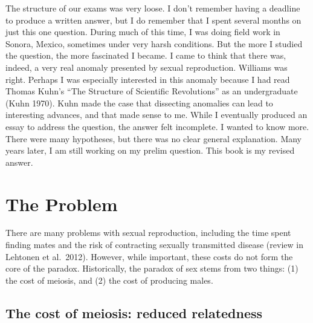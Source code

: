\documentclass[
  letterpaper,
]{book}
\begin{document}
The structure of our exams was very loose. I don't remember having a
deadline to produce a written answer, but I do remember that I spent
several months on just this one question. During much of this time, I
was doing field work in Sonora, Mexico, sometimes under very harsh
conditions. But the more I studied the question, the more fascinated I
became. I came to think that there was, indeed, a very real anomaly
presented by sexual reproduction. Williams was right. Perhaps I was
especially interested in this anomaly because I had read Thomas Kuhn's
``The Structure of Scientific Revolutions'' as an undergraduate (Kuhn
1970). Kuhn made the case that dissecting anomalies can lead to
interesting advances, and that made sense to me. While I eventually
produced an essay to address the question, the answer felt incomplete. I
wanted to know more. There were many hypotheses, but there was no clear
general explanation. Many years later, I am still working on my prelim
question. This book is my revised answer.

\hypertarget{the-problem}{%
\section{The Problem}\label{the-problem}}

There are many problems with sexual reproduction, including the time
spent finding mates and the risk of contracting sexually transmitted
disease (review in Lehtonen et al.~2012). However, while important,
these costs do not form the core of the paradox. Historically, the
paradox of sex stems from two things: (1) the cost of meiosis, and (2)
the cost of producing males.

\hypertarget{the-cost-of-meiosis-reduced-relatedness}{%
\subsection{The cost of meiosis: reduced
relatedness}\label{the-cost-of-meiosis-reduced-relatedness}}
\end{document}

